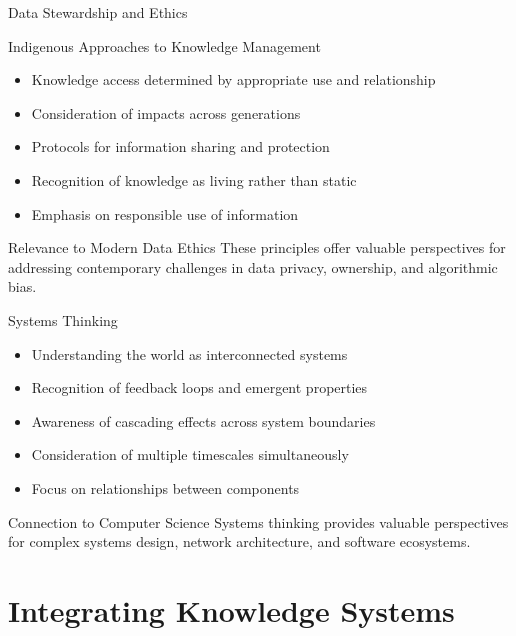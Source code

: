 \documentclass{beamer}
\begin{document}
\begin{frame}{Data Stewardship and Ethics}
    \begin{block}{Indigenous Approaches to Knowledge Management}
        \begin{itemize}
            \item Knowledge access determined by appropriate use and relationship
            \item Consideration of impacts across generations
            \item Protocols for information sharing and protection
            \item Recognition of knowledge as living rather than static
            \item Emphasis on responsible use of information
        \end{itemize}
    \end{block}
    
    \begin{block}{Relevance to Modern Data Ethics}
        These principles offer valuable perspectives for addressing contemporary challenges in data privacy, ownership, and algorithmic bias.
    \end{block}
\end{frame}

\begin{frame}{Systems Thinking}
    \begin{itemize}
        \item Understanding the world as interconnected systems
        \item Recognition of feedback loops and emergent properties
        \item Awareness of cascading effects across system boundaries
        \item Consideration of multiple timescales simultaneously
        \item Focus on relationships between components
    \end{itemize}
    
    \begin{alertblock}{Connection to Computer Science}
        Systems thinking provides valuable perspectives for complex systems design, network architecture, and software ecosystems.
    \end{alertblock}
    
\end{frame}

\section{Integrating Knowledge Systems}
\end{document}
